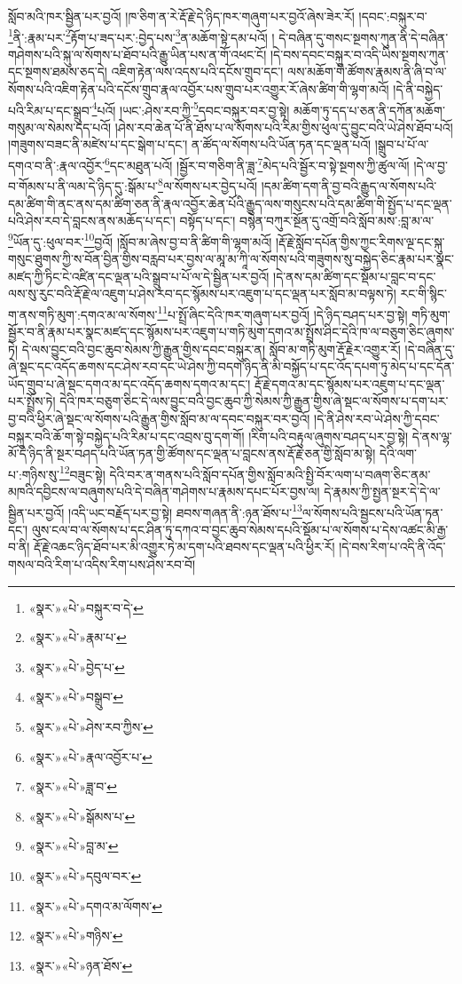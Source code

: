 སློབ་མའི་ཁར་སྦྱིན་པར་བྱའོ། །ཁ་ཅིག་ན་རེ་རྡོ་རྗེ་དེ་ཉིད་ཁར་གཞུག་པར་བྱའོ་ཞེས་ཟེར་རོ། །དབང་:བསྐུར་བ་\footnote{«སྣར་»«པེ་»བསྐུར་བ་དེ་}ནི་:རྣམ་པར་\footnote{«སྣར་»«པེ་»རྣམ་པ་}རྟོག་པ་ཟད་པར་:བྱེད་པས་\footnote{«སྣར་»«པེ་»བྱེད་པ་}ན་མཆོག་སྟེ་དམ་པའོ། །
དེ་བཞིན་དུ་གསང་སྔགས་ཀུན་ནི་དེ་བཞིན་གཤེགས་པའི་སྐུ་ལ་སོགས་པ་ཐོབ་པའི་རྒྱུ་ཡིན་པས་ན་གོ་འཕང་ངོ། །དེ་བས་དབང་བསྐུར་བ་འདི་ཡིས་སྔགས་ཀུན་དང་སྔགས་ཐམས་ཅད་དེ། འཇིག་རྟེན་ལས་འདས་པའི་དངོས་གྲུབ་དང་། ལས་མཆོག་གི་ཚོགས་རྣམས་ནི་ཞི་བ་ལ་སོགས་པའི་འཇིག་རྟེན་པའི་དངོས་གྲུབ་རྣལ་འབྱོར་པས་གྲུབ་པར་འགྱུར་རོ་ཞེས་ཚིག་གི་ལྷག་མའོ། །དེ་ནི་བསྐྱེད་པའི་རིམ་པ་དང་སྒྲུབ་\footnote{«སྣར་»«པེ་»བསྒྲུབ་}པའོ། །ཡང་:ཤེས་རབ་ཀྱི་\footnote{«སྣར་»«པེ་»ཤེས་རབ་ཀྱིས་}དབང་བསྐུར་བར་བྱ་སྟེ། མཆོག་ཏུ་དད་པ་ཅན་ནི་དཀོན་མཆོག་གསུམ་ལ་སེམས་དད་པའོ། །ཤེས་རབ་ཆེན་པོ་ནི་ཐོས་པ་ལ་སོགས་པའི་རིམ་གྱིས་ཕུལ་དུ་བྱུང་བའི་ཡེ་ཤེས་ཐོབ་པའོ། །གཟུགས་བཟང་ནི་མཛེས་པ་དང་སྒེག་པ་དང་། ན་ཚོད་ལ་སོགས་པའི་ཡོན་ཏན་དང་ལྡན་པའོ། །སྒྲུབ་པ་པོ་ལ་དགའ་བ་ནི་:རྣལ་འབྱོར་\footnote{«སྣར་»«པེ་»རྣལ་འབྱོར་པ་}དང་མཐུན་པའོ། །སྦྱོར་བ་གཅིག་ནི་ཟླ་\footnote{«སྣར་»«པེ་»ཟླ་བ་}མེད་པའི་སྦྱོར་བ་སྟེ་སྔགས་ཀྱི་ཚུལ་ལོ། །དེ་ལ་བྱ་བ་གོམས་པ་ནི་ལམ་དེ་ཉིད་དུ་:སྒོམ་པ་\footnote{«སྣར་»«པེ་»སྒོམས་པ་}ལ་སོགས་པར་བྱེད་པའོ། །དམ་ཚིག་དག་ནི་བྱ་བའི་རྒྱུད་ལ་སོགས་པའི་དམ་ཚིག་གི་ནང་ནས་དམ་ཚིག་ཅན་ནི་རྣལ་འབྱོར་ཆེན་པོའི་རྒྱུད་ལས་གསུངས་པའི་དམ་ཚིག་གི་སྤྱོད་པ་དང་ལྡན་པའི་ཤེས་རབ་དེ་བླངས་ནས་མཆོད་པ་དང་། བསྟོད་པ་དང་། བསྙེན་བཀུར་སྔོན་དུ་འགྲོ་བའི་སློབ་མས་:བླ་མ་ལ་\footnote{«སྣར་»«པེ་»བླ་མ་}ཡོན་དུ་:ཕུལ་བར་\footnote{«སྣར་»«པེ་»དབུལ་བར་}བྱའོ། །སློབ་མ་ཞེས་བྱ་བ་ནི་ཚིག་གི་ལྷག་མའོ། །རྡོ་རྗེ་སློབ་དཔོན་གྱིས་ཀྱང་རིགས་ལྔ་དང་སྐུ་གསུང་ཐུགས་ཀྱི་ས་བོན་བྱིན་གྱིས་བརླབ་པར་བྱས་ལ་མཱ་མ་ཀཱི་ལ་སོགས་པའི་གཟུགས་སུ་བསྐྱེད་ཅིང་རྣམ་པར་སྣང་མཛད་ཀྱི་ཏིང་ངེ་འཛིན་དང་ལྡན་པའི་སྒྲུབ་པ་པོ་ལ་དེ་སྦྱིན་པར་བྱའོ། །དེ་ནས་དམ་ཚིག་དང་སྡོམ་པ་བླང་བ་དང་ལས་སུ་རུང་བའི་རྡོ་རྗེ་ལ་འཇུག་པ་ཤེས་རབ་དང་སྙོམས་པར་འཇུག་པ་དང་ལྡན་པར་སློབ་མ་བལྟས་ཏེ། རང་གི་སྙིང་ག་ནས་གཏི་མུག་:དགའ་མ་ལ་སོགས་\footnote{«སྣར་»«པེ་»དགའ་མ་ལོགས་}པ་སྤྲོ་ཞིང་དེའི་ཁར་གཞུག་པར་བྱའོ། །དེ་ཉིད་བཤད་པར་བྱ་སྟེ། གཏི་མུག་སྦྱོར་བ་ནི་རྣམ་པར་སྣང་མཛད་དང་སྙོམས་པར་འཇུག་པ་གཏི་མུག་དགའ་མ་སྤྲོས་ཤིང་དེའི་ཁ་ལ་བཅུག་ཅིང་ཞུགས་ཏེ། དེ་ལས་བྱུང་བའི་བྱང་ཆུབ་སེམས་ཀྱི་རྒྱུན་གྱིས་དབང་བསྐུར་ན། སློབ་མ་གཏི་མུག་རྡོ་རྗེར་འགྱུར་རོ། །དེ་བཞིན་དུ་ཞེ་སྡང་དང་འདོད་ཆགས་དང་ཤེས་རབ་དང་ཡེ་ཤེས་ཀྱི་བདག་ཉིད་ནི་མི་བསྐྱོད་པ་དང་འོད་དཔག་ཏུ་མེད་པ་དང་དོན་ཡོད་གྲུབ་པ་ཞེ་སྡང་དགའ་མ་དང་འདོད་ཆགས་དགའ་མ་དང་། རྡོ་རྗེ་དགའ་མ་དང་སྙོམས་པར་འཇུག་པ་དང་ལྡན་པར་སྤྲོས་ཏེ། དེའི་ཁར་བཅུག་ཅིང་དེ་ལས་བྱུང་བའི་བྱང་ཆུབ་ཀྱི་སེམས་ཀྱི་རྒྱུན་གྱིས་ཞེ་སྡང་ལ་སོགས་པ་དག་པར་བྱ་བའི་ཕྱིར་ཞེ་སྡང་ལ་སོགས་པའི་རྒྱུན་གྱིས་སློབ་མ་ལ་དབང་བསྐུར་བར་བྱའོ། །དེ་ནི་ཤེས་རབ་ཡེ་ཤེས་ཀྱི་དབང་བསྐུར་བའི་ཆོ་ག་སྟེ་བསྐྱེད་པའི་རིམ་པ་དང་འབྲས་བུ་དག་གོ། །རིག་པའི་བརྟུལ་ཞུགས་བཤད་པར་བྱ་སྟེ། དེ་ནས་ལྷ་མོ་དེ་ཉིད་ནི་སྔར་བཤད་པའི་ཡོན་ཏན་གྱི་ཚོགས་དང་ལྡན་པ་བླངས་ནས་རྡོ་རྗེ་ཅན་གྱི་སློབ་མ་སྟེ། དེའི་ལག་པ་:གཉིས་སུ་\footnote{«སྣར་»«པེ་»གཉིས་}བཟུང་སྟེ། དེའི་བར་ན་གནས་པའི་སློབ་དཔོན་གྱིས་སློབ་མའི་སྤྱི་བོར་ལག་པ་བཞག་ཅིང་ནམ་མཁའི་དབྱིངས་ལ་བཞུགས་པའི་དེ་བཞིན་གཤེགས་པ་རྣམས་དཔང་པོར་བྱས་ལ། དེ་རྣམས་ཀྱི་སྤྱན་སྔར་དེ་དེ་ལ་སྦྱིན་པར་བྱའོ། །འདི་ཡང་བརྗོད་པར་བྱ་སྟེ། ཐབས་གཞན་ནི་:ཉན་ཐོས་པ་\footnote{«སྣར་»«པེ་»ཉན་ཐོས་}ལ་སོགས་པའི་སྦྱངས་པའི་ཡོན་ཏན་དང་། ལུས་ངལ་བ་ལ་སོགས་པ་དང་ཤིན་ཏུ་དཀའ་བ་བྱང་ཆུབ་སེམས་དཔའི་སྡོམ་པ་ལ་སོགས་པ་དེས་འཚང་མི་རྒྱ་བ་ནི། རྡོ་རྗེ་འཆང་ཉིད་ཐོབ་པར་མི་འགྱུར་ཏེ་མ་དག་པའི་ཐབས་དང་ལྡན་པའི་ཕྱིར་རོ། །དེ་བས་རིག་པ་འདི་ནི་འོད་གསལ་བའི་རིག་པ་འདིས་རིག་པས་ཤེས་རབ་བོ། 